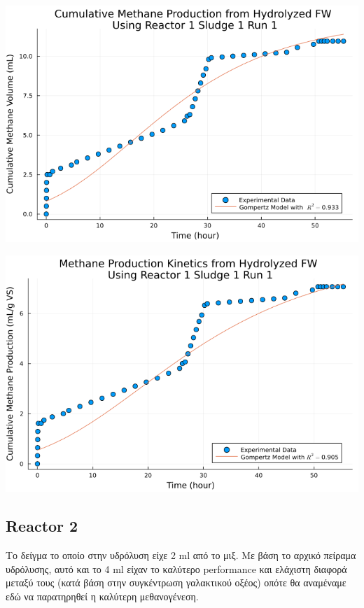 \documentclass[11pt]{article}
\begin{document}
\begin{center}
\includegraphics[width=.9\linewidth]{../plots/BMPs/Hydrolyzed FW/methane_kinetics_hydrolysate_1_s1_r1_hour.png}
\end{center}

\begin{center}
\includegraphics[width=.9\linewidth]{../plots/BMPs/Hydrolyzed FW/specific_methane_kinetics_hydrolysate_1_s1_r1_hour.png}
\end{center}

\subsection{Reactor 2}
\label{sec:org3ee9ebe}
Το δείγμα το οποίο στην υδρόλυση είχε 2 ml από το μιξ. Με βάση το αρχικό πείραμα υδρόλυσης, αυτό και το 4 ml είχαν το καλύτερο performance και ελάχιστη διαφορά μεταξύ τους (κατά βάση στην συγκέντρωση γαλακτικού οξέος) οπότε θα αναμέναμε εδώ να παρατηρηθεί η καλύτερη μεθανογένεση.
\end{document}
